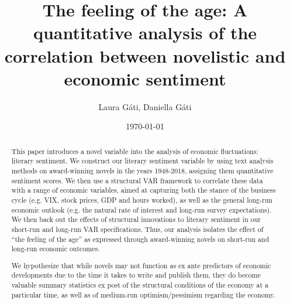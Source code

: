 \documentclass{article}
\title{The feeling of the age: A quantitative analysis of the correlation between novelistic and economic sentiment}
\author{Laura G\'ati, Daniella G\'ati}
\date{\today}
\begin{document}
\maketitle

\begin{abstract}
	This paper introduces a novel variable into the analysis of economic fluctuations: literary sentiment. We construct our literary sentiment variable by using text analysis methods on award-winning novels in the years 1948-2018, assigning them quantitative sentiment scores. We then use a structural VAR framework to correlate these data with a range of economic variables, aimed at capturing both the stance of the business cycle (e.g. VIX, stock prices, GDP and hours worked), as well as the general long-run economic outlook (e.g. the natural rate of interest and long-run survey expectations). We then back out the effects of structural innovations to literary sentiment in our short-run and long-run VAR specifications. Thus, our analysis isolates the effect of ``the feeling of the age'' as expressed through award-winning novels on short-run and long-run economic outcomes. 
	
	We hypothesize that while novels may not function as ex ante predictors of economic developments due to the time it takes to write and publish them, they do become valuable summary statistics ex post of the structural conditions of the economy at a particular time, as well as of medium-run optimism/pessimism regarding the economy. 
\end{abstract}
\end{document}
